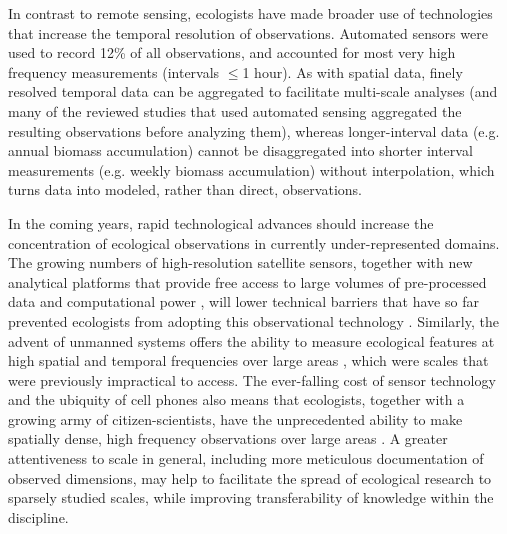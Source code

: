 \documentclass[12pt]{article}
\begin{document}
In contrast to remote sensing, ecologists have made broader use of technologies that increase the temporal resolution of observations. Automated sensors were used to record 12\% of all observations, and accounted for most very high frequency measurements (intervals $\leq$1 hour). As with spatial data, finely resolved temporal data can be aggregated to facilitate multi-scale analyses (and many of the reviewed studies that used automated sensing aggregated the resulting observations before analyzing them), whereas longer-interval data (e.g. annual biomass accumulation) cannot be disaggregated into shorter interval measurements (e.g. weekly biomass accumulation) without interpolation, which turns data into modeled, rather than direct, observations. 

In the coming years, rapid technological advances should increase the concentration of ecological observations in currently under-represented domains. The growing numbers of high-resolution satellite sensors, together with new analytical platforms that provide free access to large volumes of pre-processed data and computational power \cite{googleearthengine}, will lower technical barriers that have so far prevented ecologists from adopting this observational technology  \cite{pettorelli_satellite_2014}. Similarly, the advent of unmanned systems offers the ability to measure ecological features at high spatial and temporal frequencies over large areas \cite{anderson_lightweight_2013}, which were scales that were previously impractical to access. The ever-falling cost of sensor technology and the ubiquity of cell phones also means that ecologists, together with a growing army of citizen-scientists, have the unprecedented ability to make spatially dense, high frequency observations over large areas \cite{wolf_gsm-based_2012,collins_new_2006,porter_wireless_2005,dickinson_current_2012}.  A greater attentiveness to scale in general, including more meticulous documentation of observed dimensions, may help to facilitate the spread of ecological research to sparsely studied scales, while improving transferability of knowledge within the discipline.  


\end{document}
